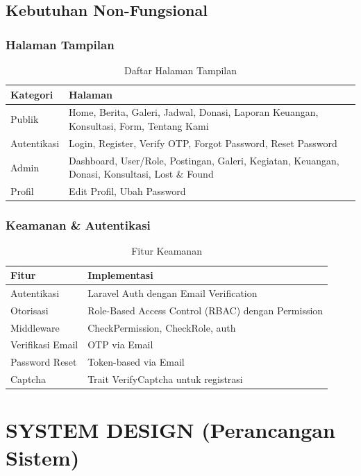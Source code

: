 \documentclass[12pt,a4paper]{article}
\begin{document}
\subsection{Kebutuhan Non-Fungsional}

\subsubsection{Halaman Tampilan}
\begin{table}[h]
\centering
\begin{tabular}{|l|p{10cm}|}
\hline
\textbf{Kategori} & \textbf{Halaman} \\
\hline
Publik & Home, Berita, Galeri, Jadwal, Donasi, Laporan Keuangan, Konsultasi, Form, Tentang Kami \\
\hline
Autentikasi & Login, Register, Verify OTP, Forgot Password, Reset Password \\
\hline
Admin & Dashboard, User/Role, Postingan, Galeri, Kegiatan, Keuangan, Donasi, Konsultasi, Lost \& Found \\
\hline
Profil & Edit Profil, Ubah Password \\
\hline
\end{tabular}
\caption{Daftar Halaman Tampilan}
\end{table}

\subsubsection{Keamanan \& Autentikasi}
\begin{table}[h]
\centering
\begin{tabular}{|l|p{8cm}|}
\hline
\textbf{Fitur} & \textbf{Implementasi} \\
\hline
Autentikasi & Laravel Auth dengan Email Verification \\
Otorisasi & Role-Based Access Control (RBAC) dengan Permission \\
Middleware & CheckPermission, CheckRole, auth \\
Verifikasi Email & OTP via Email \\
Password Reset & Token-based via Email \\
Captcha & Trait VerifyCaptcha untuk registrasi \\
\hline
\end{tabular}
\caption{Fitur Keamanan}
\end{table}

\newpage

\section{SYSTEM DESIGN (Perancangan Sistem)}
\end{document}

